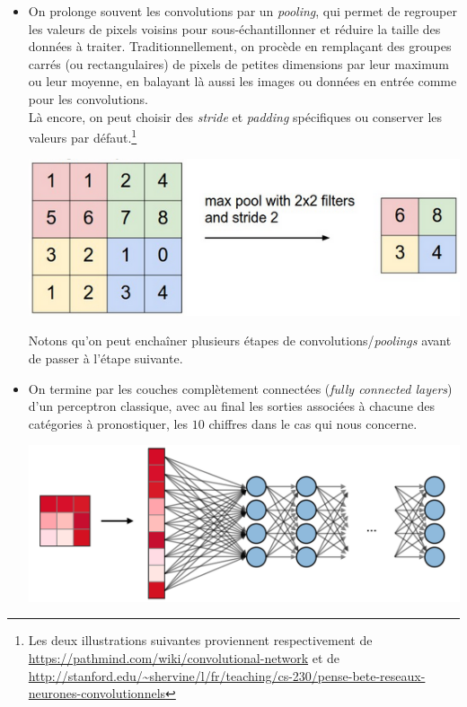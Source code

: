 \documentclass[a4paper,11pt]{article} %
\begin{document}
\begin{itemize}
\begin{center}
	\end{center}
    Si l'on souhaite une profondeur multiple en sortie, on utilise un \emph{kernel} à plusieurs canaux, chacun agissant comme un filtre indépendant qui fournit un niveau de profondeur en sortie. Il y en a deux notés W0 et W1 sur l'illustration précédente\footnote{Source: image animée sur \url{https://cs231n.github.io/convolutional-networks/}}.\\
	\item
	On prolonge souvent les convolutions par un \emph{pooling}, qui permet de regrouper les valeurs de pixels voisins pour sous-échantillonner et  réduire la taille des données à traiter. Traditionnellement, on procède en remplaçant des groupes carrés (ou rectangulaires) de pixels de petites dimensions par leur maximum ou leur moyenne, en balayant là aussi les images ou données en entrée comme pour les convolutions.\\
	Là encore, on peut choisir des \emph{stride} et \emph{padding} spécifiques ou conserver les valeurs par défaut.\footnote{Les deux illustrations suivantes proviennent respectivement de\\ \url{https://pathmind.com/wiki/convolutional-network} et de\\ \url{http://stanford.edu/~shervine/l/fr/teaching/cs-230/pense-bete-reseaux-neurones-convolutionnels}}
	\begin{center}
		\includegraphics[width=0.6\linewidth]{pooling.png}
	\end{center}
   Notons qu'on peut enchaîner plusieurs étapes de convolutions/\emph{poolings} avant de passer à l'étape suivante.
	\item
	On termine par les couches complètement connectées (\emph{fully connected layers}) d'un perceptron classique, avec au final les sorties associées à chacune des catégories à pronostiquer, les $10$ chiffres dans le cas qui nous concerne.
	\begin{center}
		\includegraphics[width=0.8\linewidth]{fully-connected.png}
	\end{center}
\end{itemize}
\end{document}
